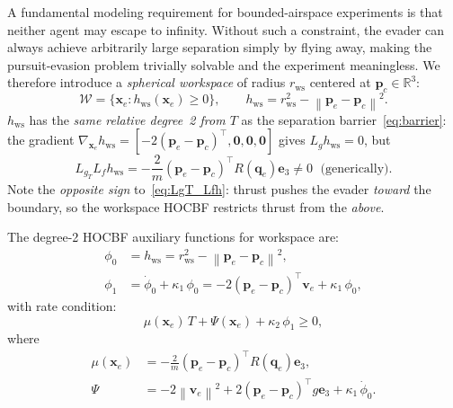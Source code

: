 \documentclass[lettersize,journal]{IEEEtran}
\theoremstyle{definition}
\theoremstyle{remark}
\newcommand{\R}{\mathbb{R}}
\newcommand{\norm}[1]{\left\| #1 \right\|}
\newcommand{\vect}[1]{\bm{#1}}
\begin{document}
A fundamental modeling requirement for bounded-airspace experiments is
that neither agent may escape to infinity.
Without such a constraint, the evader can always achieve arbitrarily
large separation simply by flying away, making the pursuit-evasion
problem trivially solvable and the experiment meaningless.
We therefore introduce a \emph{spherical workspace} of radius
$r_\mathrm{ws}$ centered at $\vect{p}_c \in \R^3$:
\begin{equation}
    \mathcal{W} = \bigl\{
        \vect{x}_e : h_\mathrm{ws}(\vect{x}_e) \geq 0
    \bigr\},
    \qquad
    h_\mathrm{ws} = r_\mathrm{ws}^2 - \norm{\vect{p}_e - \vect{p}_c}^2.
    \label{eq:ws_barrier}
\end{equation}
$h_\mathrm{ws}$ has the \emph{same relative degree~2 from $T$} as the
separation barrier~\eqref{eq:barrier}: the gradient
$\nabla_{\vect{x}_e}h_\mathrm{ws} = [{-2(\vect{p}_e-\vect{p}_c)^\top},
\vect{0},\vect{0},\vect{0}]$ gives $L_g h_\mathrm{ws} = 0$, but
\begin{equation}
    L_{g_T}L_f h_\mathrm{ws}
        = -\frac{2}{m}(\vect{p}_e-\vect{p}_c)^\top R(\vect{q}_e)\vect{e}_3
        \neq 0 \;\text{ (generically)}.
    \label{eq:LgT_Lfhws}
\end{equation}
Note the \emph{opposite sign} to~\eqref{eq:LgT_Lfh}: thrust pushes
the evader \emph{toward} the boundary, so the workspace HOCBF
restricts thrust from the \emph{above}.

The degree-2 HOCBF auxiliary functions for workspace are:
\begin{align}
    \phi_0 &= h_\mathrm{ws}
             = r_\mathrm{ws}^2 - \norm{\vect{p}_e-\vect{p}_c}^2,
             \label{eq:phi0} \\
    \phi_1 &= \dot{\phi}_0 + \kappa_1\,\phi_0
             = -2(\vect{p}_e-\vect{p}_c)^\top\vect{v}_e
               + \kappa_1\,\phi_0,
             \label{eq:phi1}
\end{align}
with rate condition:
\begin{equation}
    \mu(\vect{x}_e)\,T + \Psi(\vect{x}_e) + \kappa_2\,\phi_1 \geq 0,
    \label{eq:ws_hocbf_cond}
\end{equation}
where
\begin{align}
    \mu(\vect{x}_e)
        &= -\frac{2}{m}(\vect{p}_e-\vect{p}_c)^\top R(\vect{q}_e)\vect{e}_3,
        \label{eq:mu} \\
    \Psi &= -2\norm{\vect{v}_e}^2
             + 2(\vect{p}_e-\vect{p}_c)^\top g\vect{e}_3
             + \kappa_1\,\dot{\phi}_0.
        \label{eq:Psi}
\end{align}
\end{document}
